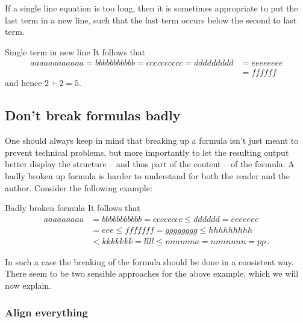If a single line equation is too long, then it is sometimes appropriate to put the last term in a new line, such that the last term occurs below the second to last term.
\begin{showlatex}{Single term in new line}
It follows that
\begin{align*}
  aaaaaaaaaaaa
  =
  bbbbbbbbbbb
  =
  cccccccccc
  =
  ddddddddd
  &=
  eeeeeeee
  \\
  &=
  ffffff
\end{align*}
and hence $2 + 2 = 5$.
\end{showlatex}




\subsection{Don’t break formulas badly}

One should always keep in mind that breaking up a formula isn’t just meant to prevent technical problems, but more importantly to let the resulting output better display the structure -- and thus part of the content -- of the formula.
A badly broken up formula is harder to understand for both the reader and the author.
Consider the following example:
\begin{showlatex}{Badly broken formula}
It follows that
\begin{align*}
  aaaaaaaaa
  &=
  bbbbbbbbbbb
  =
  cccccccc
  \leq
  dddddd
  =
  eeeeeee
  \\
  &=
  eee
  \leq
  fffffff
  =
  gggggggg
  \leq
  hhhhhhhhh
  \\
  &<
  kkkkkkk
  =
  llll
  \leq
  mmmma
  =
  nnnnnnn
  =
  pp \,.
\end{align*}
\end{showlatex}
In such a case the breaking of the formula should be done in a consistent way.
There seem to be two sensible approaches for the above example, which we will now explain.

\subsubsection{Align everything}

